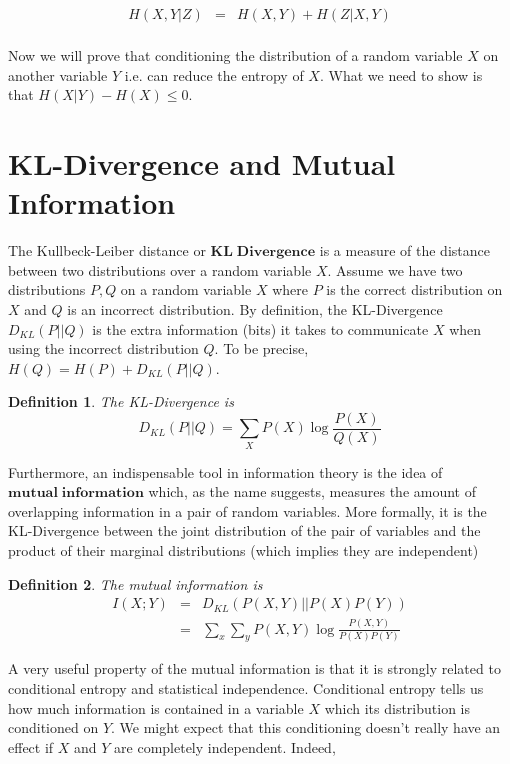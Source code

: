 \documentclass[a4paper,11pt]{book}
\newtheorem{definition}{Definition}
\begin{document}
\begin{eqnarray*}
H(X,Y|Z) &=& H(X,Y) + H(Z|X,Y)\\
\end{eqnarray*}


Now we will prove that conditioning the distribution of a random variable $X$ on another variable $Y$ i.e. can reduce the entropy of $X$. What we need to show is that $H(X|Y) - H(X) \leq 0$.


\section{KL-Divergence and Mutual Information}

The Kullbeck-Leiber distance or $\mathbf{KL\;Divergence}$ is a measure of the distance between two distributions over a random variable $X$. Assume we have two distributions $P,Q$ on a random variable $X$ where $P$ is the correct distribution on $X$ and $Q$ is an incorrect distribution. By definition, the KL-Divergence $D_{KL}(P||Q)$ is the extra information (bits) it takes to communicate $X$ when using the incorrect distribution $Q$. To be precise, $H(Q) = H(P) + D_{KL}(P||Q)$.

\begin{definition}
The KL-Divergence is 
\begin{equation*}
D_{KL}(P||Q) = \sum_{X} P(X) \log \frac{P(X)}{Q(X)}
\end{equation*}
\end{definition}

Furthermore, an indispensable tool in information theory is the idea of $\mathbf{mutual\;information}$ which, as the name suggests, measures the amount of overlapping information in a pair of random variables. More formally, it is the KL-Divergence between the joint distribution of the pair of variables and the product of their marginal distributions (which implies they are independent)

\begin{definition}
The mutual information is 
\begin{eqnarray*}
I(X;Y) &=& D_{KL}(P(X,Y)||P(X)P(Y)) \\
&=& \sum_{x}\sum_{y} P(X,Y) \log \frac{P(X,Y)}{P(X)P(Y)}
\end{eqnarray*}
\end{definition}

A very useful property of the mutual information is that it is strongly related to conditional entropy and statistical independence. Conditional entropy tells us how much information is contained in a variable $X$ which its distribution is conditioned on $Y$. We might expect that this conditioning doesn't really have an effect if $X$ and $Y$ are completely independent. Indeed,
\end{document}
